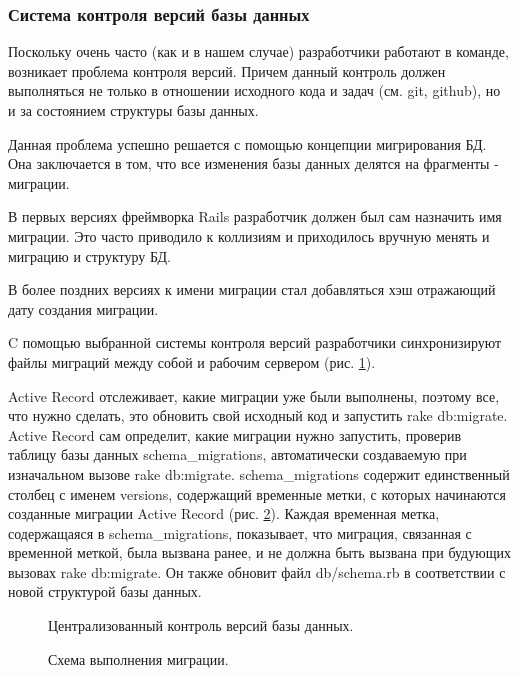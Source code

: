 \subsubsection{Система контроля версий базы данных}
Поскольку очень часто (как и в нашем случае) разработчики работают в команде,
возникает проблема контроля версий. Причем данный контроль должен выполняться не
только в отношении исходного кода и задач (см. git, github), но и за состоянием
структуры базы данных.

Данная проблема успешно решается с помощью концепции мигрирования БД. Она
заключается в том, что все изменения базы данных делятся на фрагменты -
миграции.

В первых версиях фреймворка Rails разработчик должен был сам назначить имя
миграции. Это часто приводило к коллизиям и приходилось вручную менять и
миграцию и структуру БД.

В более поздних версиях к имени миграции стал добавляться хэш отражающий дату
создания миграции.

C помощью выбранной системы контроля версий разработчики синхронизируют файлы
миграций между собой и рабочим сервером (рис. \ref{ris:development_migrations}).

Active Record отслеживает, какие миграции уже были выполнены, поэтому все, что
нужно сделать, это обновить свой исходный код и запустить rake db:migrate.
Active Record сам определит, какие миграции нужно запустить, проверив таблицу
базы данных schema\_migrations, автоматически создаваемую при изначальном вызове
rake db:migrate. schema\_migrations содержит единственный столбец с именем
versions, содержащий временные метки, с которых начинаются созданные миграции
Active Record (рис. \ref{ris:migration_algorithm}). Каждая временная метка,
содержащаяся в schema\_migrations, показывает, что миграция, связанная с временной меткой, была
вызвана ранее, и не должна быть вызвана при будующих вызовах rake db:migrate. Он
также обновит файл db/schema.rb в соответствии с новой структурой базы данных.

\begin{figure}[h]
\caption{Централизованный контроль версий базы данных.}
\label{ris:development_migrations}
\end{figure}

\begin{figure}[h]
\caption{Схема выполнения миграции.}
\label{ris:migration_algorithm}
\end{figure}

